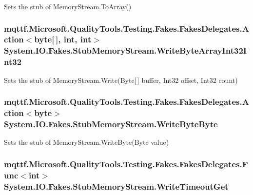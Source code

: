 Sets the stub of Memory\-Stream.\-To\-Array()

\hypertarget{class_system_1_1_i_o_1_1_fakes_1_1_stub_memory_stream_a35b65955861bd339c5406760107ad750}{
\subsubsection[{Write\-Byte\-Array\-Int32\-Int32}]{\setlength{\rightskip}{0pt plus 5cm}mqttf.\-Microsoft.\-Quality\-Tools.\-Testing.\-Fakes.\-Fakes\-Delegates.\-Action$<$byte\mbox{[}$\,$\mbox{]}, int, int$>$ System.\-I\-O.\-Fakes.\-Stub\-Memory\-Stream.\-Write\-Byte\-Array\-Int32\-Int32}}\label{class_system_1_1_i_o_1_1_fakes_1_1_stub_memory_stream_a35b65955861bd339c5406760107ad750}


Sets the stub of Memory\-Stream.\-Write(\-Byte\mbox{[}$\,$\mbox{]} buffer, Int32 offset, Int32 count)

\hypertarget{class_system_1_1_i_o_1_1_fakes_1_1_stub_memory_stream_a8d2d4181be55765c15bfa8a1bceb0f44}{
\subsubsection[{Write\-Byte\-Byte}]{\setlength{\rightskip}{0pt plus 5cm}mqttf.\-Microsoft.\-Quality\-Tools.\-Testing.\-Fakes.\-Fakes\-Delegates.\-Action$<$byte$>$ System.\-I\-O.\-Fakes.\-Stub\-Memory\-Stream.\-Write\-Byte\-Byte}}\label{class_system_1_1_i_o_1_1_fakes_1_1_stub_memory_stream_a8d2d4181be55765c15bfa8a1bceb0f44}


Sets the stub of Memory\-Stream.\-Write\-Byte(\-Byte value)

\hypertarget{class_system_1_1_i_o_1_1_fakes_1_1_stub_memory_stream_a7d7b54e784888bc355051823dc4a84a5}{
\subsubsection[{Write\-Timeout\-Get}]{\setlength{\rightskip}{0pt plus 5cm}mqttf.\-Microsoft.\-Quality\-Tools.\-Testing.\-Fakes.\-Fakes\-Delegates.\-Func$<$int$>$ System.\-I\-O.\-Fakes.\-Stub\-Memory\-Stream.\-Write\-Timeout\-Get}}\label{class_system_1_1_i_o_1_1_fakes_1_1_stub_memory_stream_a7d7b54e784888bc355051823dc4a84a5}


